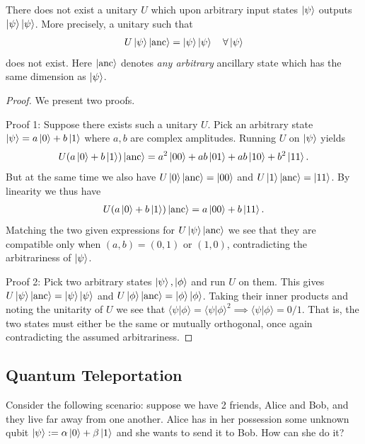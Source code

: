 \begin{theorem}
    There does not exist a unitary $U$ which upon arbitrary input states $\ket{\psi}$ outputs $\ket{\psi}\ket{\psi}$. More precisely, a unitary such that
    \begin{align*}
        U\ket{\psi}\ket{\text{anc}} = \ket{\psi}\ket{\psi} \quad\forall \ket{\psi}
    \end{align*}
    does not exist. Here $\ket{\text{anc}}$ denotes \textit{any arbitrary} ancillary state which has the same dimension as $\ket{\psi}$.
\end{theorem}
\begin{proof}
    We present two proofs.
    
    Proof 1: Suppose there exists such a unitary $U$. Pick an arbitrary state $\ket{\psi}=a\ket{0}+b\ket{1}$ where $a,b$ are complex amplitudes. Running $U$ on $\ket{\psi}$ yields
    \begin{align*}
        U(a\ket{0}+b\ket{1})\ket{\text{anc}} = a^2\ket{00}+ab\ket{01}+ab\ket{10}+b^2\ket{11}.
    \end{align*}
    But at the same time we also have $U\ket{0}\ket{\text{anc}}=\ket{00}$ and $U\ket{1}\ket{\text{anc}}=\ket{11}$. By linearity we thus have 
    \begin{align*}
        U(a\ket{0}+b\ket{1})\ket{\text{anc}} = a\ket{00}+b\ket{11}.
    \end{align*}
    Matching the two given expressions for $U\ket{\psi}\ket{\text{anc}}$ we see that they are compatible only when $(a,b)=(0,1)$ or $(1,0)$, contradicting the arbitrariness of $\ket{\psi}$.

    Proof 2: Pick two arbitrary states $\ket{\psi}, \ket{\phi}$ and run $U$ on them. This gives $U\ket{\psi}\ket{\text{anc}} = \ket{\psi}\ket{\psi}$ and $U\ket{\phi}\ket{\text{anc}} = \ket{\phi}\ket{\phi}$. Taking their inner products and noting the unitarity of $U$ we see that $\langle \psi|\phi \rangle = \langle \psi|\phi \rangle^2 \implies \langle \psi|\phi \rangle=0/1$. That is, the two states must either be the same or mutually orthogonal, once again contradicting the assumed arbitrariness.
\end{proof}

\subsection{Quantum Teleportation}

Consider the following scenario: suppose we have 2 friends, Alice and Bob, and they live far away from one another. Alice has in her possession some unknown qubit \(\ket{\psi} := \alpha \ket{0} + \beta \ket{1}\) and she wants to send it to Bob. How can she do it? 

